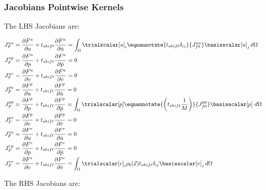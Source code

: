 \subsubsection{Jacobians Pointwise Kernels}

The LHS Jacobians are:

\begin{align}
J_F^{uu} &= \frac{\partial F^u}{\partial u} + t_{shift} \frac{\partial F^u}{\partial \dot{u}} =
\int_{\Omega} \trialscalar[u]_{i} \eqnannotate{t_{shift} \delta_{ij}}{J^{uu}_{f0}} \basisscalar[u]_{j} \, d \Omega \\
%
J_F^{up} &= \frac{\partial F^u}{\partial p} + t_{shift} \frac{\partial F^u}{\partial \dot{p}} = 0 \\
%
J_F^{uv} &= \frac{\partial F^u}{\partial v} + t_{shift} \frac{\partial F^u}{\partial \dot{v}} = 0 \\
%
J_F^{pu} &= \frac{\partial F^p}{\partial u} + t_{shift} \frac{\partial F^p}{\partial \dot{u}} = 0 \\
J_F^{pp} &= \frac{\partial F^p}{\partial p} + t_{shift} \frac{\partial F^p}{\partial \dot{p}} = \int_{\Omega} \trialscalar[p]
\eqnannotate{\left(t_{shift} \frac{1}{M}\right)}{J_{f0}^{pp}} \basisscalar[p] \ d\Omega \\
%
J_F^{pv} &= \frac{\partial F^p}{\partial v} + t_{shift} \frac{\partial F^p}{\partial \dot{v}} = 0 \\
%
J_F^{vu} &= \frac{\partial F^v}{\partial u} + t_{shift} \frac{\partial F^v}{\partial \dot{u}} = 0 \\
%
J_F^{vp} &= \frac{\partial F^v}{\partial p} + t_{shift} \frac{\partial F^v}{\partial \dot{p}} = 0 \\
J_F^{vv} &= \frac{\partial F^v}{\partial v} + t_{shift} \frac{\partial F^v}{\partial \dot{v}} =
\int_{\Omega} \trialscalar[v]_{i} \rho_{b}(\vec{x}) t_{shift} \delta_{ij} \basisscalar[v]_{j} \, d \Omega
\end{align}

The RHS Jacobians are:

